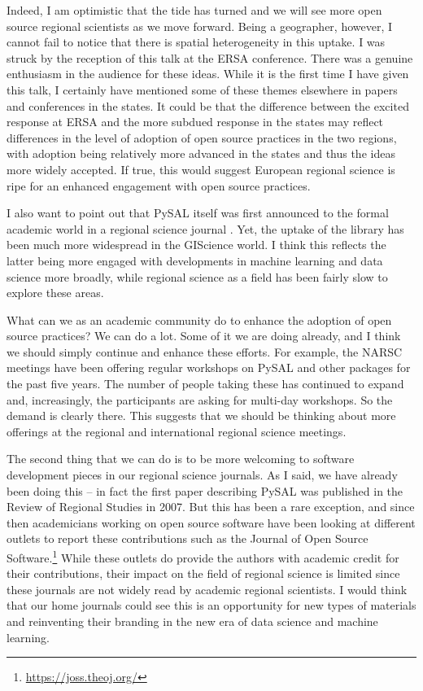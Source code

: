 \documentclass[11pt]{article}
\begin{document}
Indeed, I am optimistic that the tide has turned and we will see more open
source regional scientists as we move forward. Being a geographer, however, I
cannot fail to notice that there is spatial heterogeneity in this uptake. I was
struck by the reception of this talk at the ERSA conference. There was a
genuine enthusiasm in the audience for these ideas. While it is the first time
I have given this talk, I certainly have mentioned some of these themes elsewhere
in papers \citep{Rey17_codeastext,rey_open_2014,Rey_2009} and conferences in the
states. It could be that the difference between the excited response at ERSA
and the more subdued response in the states may reflect differences in the
level of adoption of open source practices in the two regions, with adoption
being relatively more advanced in the states and thus the ideas more widely
accepted. If true, this would suggest European regional science is ripe for an
enhanced engagement with open source practices.

I also want to point out that PySAL itself was first announced to the formal
academic world in a regional science journal \citep{rey_pysal:_2007-3}. Yet,
the uptake of the library has been much more widespread in the GIScience world.
I think this reflects the latter being more engaged with developments in
machine learning and data science more broadly, while regional science as a
field has been fairly slow to explore these areas.

What can we as an academic community do to enhance the adoption of open source
practices? We can do a lot. Some of it we are doing already, and I think we
should simply continue and enhance these efforts. For example, the NARSC
meetings have been offering regular workshops on PySAL and other packages
for the past five years. The number of people taking these has
continued to expand and, increasingly, the participants are  asking for
multi-day workshops. So the demand is clearly there. This suggests that we
should be thinking about more offerings at the regional and international
regional science meetings.

The second thing that we can do is to be more welcoming to software development
pieces in our regional science journals. As I said, we have already been doing
this -- in fact the first paper describing PySAL was published in the Review of
Regional Studies in 2007. But this has been a rare exception, and since then
academicians working on open source software have been looking at different
outlets to report these contributions such as the Journal of Open Source
Software.\footnote{\url{https://joss.theoj.org/}} While these outlets do provide the authors with academic credit for
their contributions, their impact on the field of regional science is limited
since these journals are not widely read by academic regional scientists. I
would think that our home journals could see this is an opportunity for new
types of materials and reinventing their branding in the new era of  
data science and machine learning. 
\end{document}
